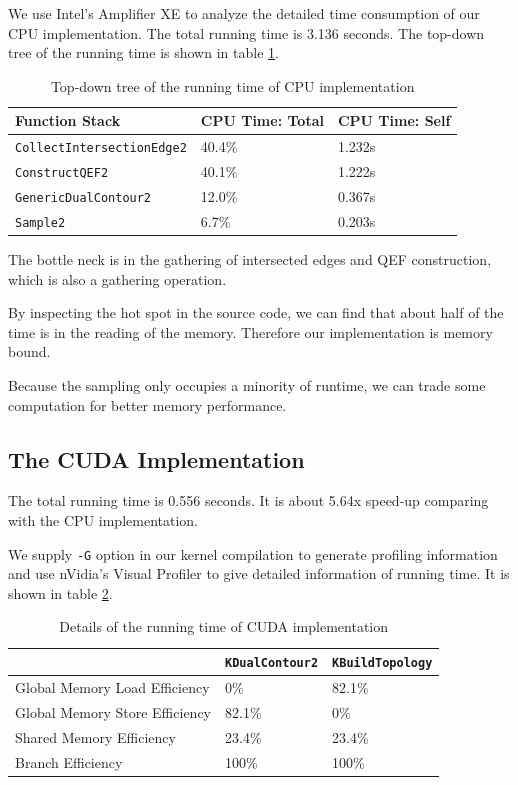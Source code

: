 \documentclass[a4paper,12pt]{article}
\begin{document}
We use Intel's Amplifier XE to analyze the detailed time consumption
of our CPU implementation.
The total running time is 3.136 seconds.
The top-down tree of the running time is shown in table
\ref{tab:dc2-cpu-performance}.

\begin{table}[h]
\centering
\begin{tabular}{| l | l | l |}
\hline
Function Stack & CPU Time: Total & CPU Time: Self\\  \hline
\texttt{CollectIntersectionEdge2} & 40.4\% & 1.232s \\
\texttt{ConstructQEF2} & 40.1\% & 1.222s \\
\texttt{GenericDualContour2} & 12.0\% & 0.367s \\
\texttt{Sample2} & 6.7\% & 0.203s \\
\hline
\end{tabular}
\caption{Top-down tree of the running time of CPU implementation}
\label{tab:dc2-cpu-performance}
\end{table}

The bottle neck is in the gathering of intersected edges and
QEF construction, which is also a gathering operation.

By inspecting the hot spot in the source code,
we can find that about half of the time is in the reading of the memory.
Therefore our implementation is memory bound.

Because the sampling only occupies a minority of runtime,
we can trade some computation for better memory performance.

\subsection{The CUDA Implementation}

The total running time is 0.556 seconds.
It is about 5.64x speed-up comparing with the CPU implementation.

We supply \texttt{-G} option in our kernel compilation to generate
profiling information
and use nVidia's Visual Profiler to give detailed information of running time.
It is shown in table \ref{tab:cudc2-cuda-performance}.

\begin{table}[h]
\centering
\begin{tabular}{| l | l | l |}
\hline
& \texttt{KDualContour2} & \texttt{KBuildTopology}\\  \hline
Global Memory Load Efficiency & 0\% & 82.1\%\\
Global Memory Store Efficiency & 82.1\% & 0\%\\
Shared Memory Efficiency & 23.4\% & 23.4\%\\
Branch Efficiency & 100\% & 100\%\\
\hline
\end{tabular}
\caption{Details of the running time of CUDA implementation}
\label{tab:cudc2-cuda-performance}
\end{table}
\end{document}
